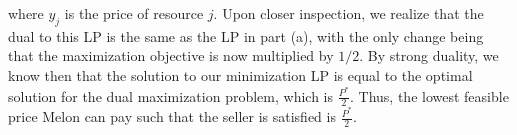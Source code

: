 \documentclass{6046}
\begin{document}
where $y_j$ is the price of resource $j$. Upon closer inspection,
we realize that the dual to this LP is the same as the LP in
part (a), with the only change being that the maximization objective
is now multiplied by $1/2$. By strong duality, we know then that
the solution to our minimization LP is equal to the
optimal solution for the dual maximization problem,
which is $\frac{P^*}{2}$. Thus,
the lowest feasible price Melon can pay such that the seller is
satisfied is $\frac{P^*}{2}$.
\end{document}
